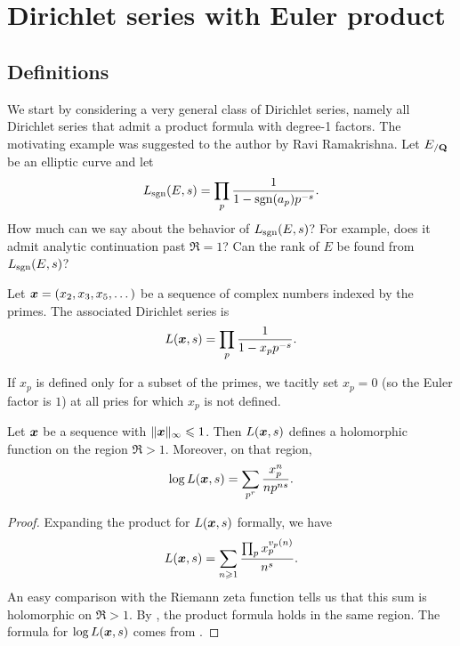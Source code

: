
\chapter{Dirichlet series with Euler product}





\section{Definitions}

We start by considering a very general class of Dirichlet series, namely all 
Dirichlet series that admit a product formula with degree-1 factors. The 
motivating example was suggested to the author by Ravi Ramakrishna. Let 
$E_{/\mathbf{Q}}$ be an elliptic curve and let 
\[
	L_{\operatorname{sgn}}(E,s) = \prod_p \frac{1}{1-\operatorname{sgn}(a_p) p^{-s}} .
\]
How much can we say about the behavior of $L_{\operatorname{sgn}}(E,s)$? For example, does it 
admit analytic continuation past $\Re = 1$? Can the rank of $E$ be found from 
$L_{\operatorname{sgn}}(E,s)$?

\begin{definition}
Let ${\boldsymbol x}=(x_2,x_3,x_5,\dots)$ be a sequence of complex numbers indexed by the 
primes. The associated Dirichlet series is 
\[
	L({\boldsymbol x},s) = \prod_p \frac{1}{1- x_p p^{-s}} .
\]
\end{definition}

If $x_p$ is defined only for a subset of the primes, we tacitly set $x_p = 0$ 
(so the Euler factor is $1$) at all pries for which $x_p$ is not defined. 

\begin{lemma}
Let ${\boldsymbol x}$ be a sequence with $\|{\boldsymbol x}\|_\infty \leqslant 1$. Then $L({\boldsymbol x},s)$ 
defines a holomorphic function on the region $\Re > 1$. Moreover, on that 
region, 
\[
	\log L({\boldsymbol x},s) = \sum_{p^r} \frac{x_p^n}{n p^{n s}} .
\]
\end{lemma}
\begin{proof}
Expanding the product for $L({\boldsymbol x},s)$ formally, we have 
\[
	L({\boldsymbol x},s) = \sum_{n\geqslant 1} \frac{\prod_p x_p^{v_p(n)}}{n^s} .
\]
An easy comparison with the Riemann zeta function tells us that this sum 
is holomorphic on $\Re > 1$. By \cite[Th.~11.7]{apostol-1976}, the 
product formula holds in the same region. The formula for $\log L({\boldsymbol x},s)$ 
comes from \cite[11.9 Ex.2]{apostol-1976}. 
\end{proof}

